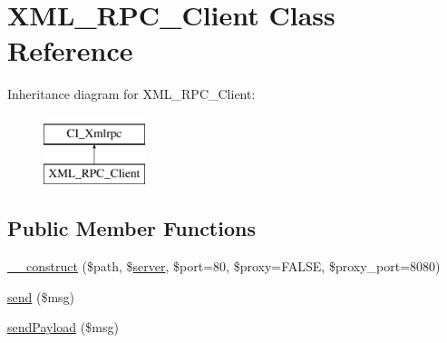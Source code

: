\hypertarget{class_x_m_l___r_p_c___client}{}\section{X\+M\+L\+\_\+\+R\+P\+C\+\_\+\+Client Class Reference}
\label{class_x_m_l___r_p_c___client}
Inheritance diagram for X\+M\+L\+\_\+\+R\+P\+C\+\_\+\+Client\+:\begin{figure}[H]
\begin{center}
\leavevmode
\includegraphics[height=2.000000cm]{class_x_m_l___r_p_c___client}
\end{center}
\end{figure}
\subsection*{Public Member Functions}
\begin{DoxyCompactItemize}
\item 
\hyperlink{class_x_m_l___r_p_c___client_ab665c9b62c100416c6c1e20ec650f553}{\+\_\+\+\_\+construct} (\$path, \$\hyperlink{class_c_i___xmlrpc_a9969815a7195f6915eb73afcab3f9e9e}{server}, \$port=80, \$proxy=F\+A\+L\+S\+E, \$proxy\+\_\+port=8080)
\item 
\hyperlink{class_x_m_l___r_p_c___client_a10284ca4704ff9e94185f95baa21973f}{send} (\$msg)
\item 
\hyperlink{class_x_m_l___r_p_c___client_a040f0b8dcbcaac6a33ca0541befed955}{send\+Payload} (\$msg)
\end{DoxyCompactItemize}
